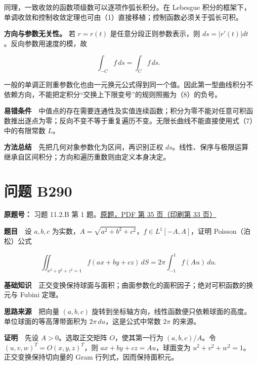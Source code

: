\documentclass[11pt,a4paper]{article}
\begin{document}
同理，一致收敛的函数项级数可以逐项作弧长积分。在 Lebesgue
积分的框架下，单调收敛和控制收敛定理也可由（1）直接移植；控制函数必须关于弧长可积。

\textbf{方向与参数无关性。} 若 \(r=r(t)\) 是任意分段正则参数表示，则
\(ds=|r'(t)|dt\)。反向参数用速度的模，故

\begin{equation}
\int_{-C}f\,ds=\int_Cf\,ds.
\tag{8}
\end{equation}

一般的单调正则重参数化也由一元换元公式得到同一个值。因此第一型曲线积分不依赖方向，不能把定积分``交换上下限变号''的规则照搬为（8）的负号。

\textbf{易错条件}　中值点的存在需要连通性及实值连续函数；积分为零不能对任意可积函数推出逐点为零；反向不变不等于重复遍历不变。无限长曲线不能直接使用式（7）中的有限常数
\(L\)。

\textbf{方法总结}　先把几何对象参数化为区间，再识别正权
\(ds\)。线性、保序与极限运算继承自区间积分；方向和遍历重数则由定义本身决定。

\section{问题 B290}\label{ux95eeux9898-b290}

\textbf{原题号：} 习题 11.2.B 第 1
题。\href{https://zj139.github.io/math-notes/files/problems/楼分析习题-v2.pdf\#page=35}{原题，PDF
第 35 页（印刷第 33 页）}

\textbf{题目}　设 \(a,b,c\)
为实数，\(A=\sqrt{a^2+b^2+c^2}\)，\(f\in L^1[-A,A]\)，证明
Poisson（泊松）公式

\begin{equation}
\iint_{x^2+y^2+z^2=1}f(ax+by+cz)\,dS
=2\pi\int_{-1}^1f(Au)\,du.
\tag{9}
\end{equation}

\textbf{基础知识}　正交变换保持球面与面积；曲面参数化的面积因子；绝对可积函数的换元与
Fubini 定理。

\textbf{思路来源}　把向量 \((a,b,c)\)
旋转到坐标轴方向，线性函数便只依赖球面的高度。单位球面的等高薄带面积为
\(2\pi\,du\)，这是公式中常数 \(2\pi\) 的来源。

\textbf{证明}　先设 \(A>0\)。选取正交矩阵 \(O\)，使其第一行为
\((a,b,c)/A\)。令 \((u,v,w)^T=O(x,y,z)^T\)，则 \(ax+by+cz=Au\)，球面变为
\(u^2+v^2+w^2=1\)。正交变换保持切向量的 Gram 行列式，因而保持面积元。
\end{document}
